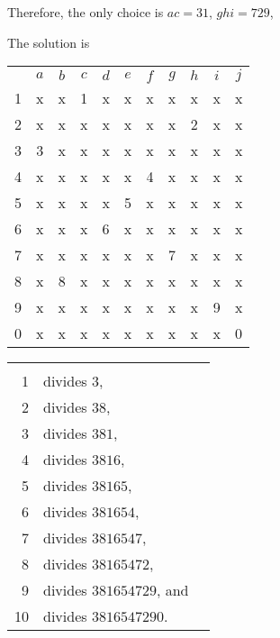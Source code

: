 Therefore, the only choice is $ac=31$, $ghi=729$,

The solution is
\begin{center}
\begin{tabular}{ccccccccccc}
			&	$a$	&	$b$	&	$c$	&	$d$	&	$e$	&	$f$	&	$g$	&	$h$	&	$i$	&	$j$	\\
	1		&	x	&	x	&	1	&	x	&	x	&	x	&	x	&	x	&	x	&	x	\\
	2		&	x	&	x	&	x	&	x	&	x	&	x	&	x	&	2	&	x	&	x	\\
	3		&	3	&	x	&	x	&	x	&	x	&	x	&	x	&	x	&	x	&	x	\\
	4		&	x	&	x	&	x	&	x	&	x	&	4	&	x	&	x	&	x	&	x	\\
	5		&	x	&	x	&	x	&	x	&	5	&	x	&	x	&	x	&	x	&	x	\\
	6		&	x	&	x	&	x	&	6	&	x	&	x	&	x	&	x	&	x	&	x	\\
	7		&	x	&	x	&	x	&	x	&	x	&	x	&	7	&	x	&	x	&	x	\\
	8		&	x	&	8	&	x	&	x	&	x	&	x	&	x	&	x	&	x	&	x	\\
	9		&	x	&	x	&	x	&	x	&	x	&	x	&	x	&	x	&	9	&	x	\\
	0		&	x	&	x	&	x	&	x	&	x	&	x	&	x	&	x	&	x	&	0	\\
\end{tabular}
\hspace{1cm}\vline\hspace{1cm}
\begin{tabular}{rll}
	& 		\\
	1	&	divides $3$,					\\
	2	&	divides $38$,					\\
	3	&	divides $381$,					\\
	4	&	divides $3816$,					\\
	5	&	divides $38165$,				\\
	6	&	divides $381654$,				\\
	7	&	divides $3816547$,				\\
	8	&	divides $38165472$,				\\
	9	&	divides $381654729$, and		\\
	10	&	divides $3816547290$.
\end{tabular}
\end{center}
